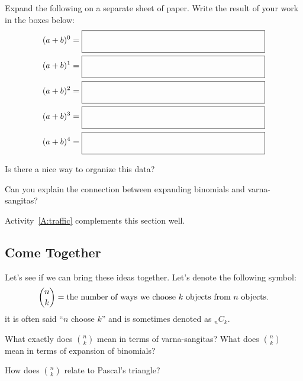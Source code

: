 Expand the following on a separate sheet of paper. Write the result
of your work in the boxes below:
\begin{align*}
(a + b)^0 &=  \raisebox{-3mm}{\fbox{\rule[0mm]{0mm}{7mm}\hspace{50ex}}} \\
(a + b)^1 &=  \raisebox{-3mm}{\fbox{\rule[0mm]{0mm}{7mm}\hspace{50ex}}} \\
(a + b)^2 &=  \raisebox{-3mm}{\fbox{\rule[0mm]{0mm}{7mm}\hspace{50ex}}} \\
(a + b)^3 &=  \raisebox{-3mm}{\fbox{\rule[0mm]{0mm}{7mm}\hspace{50ex}}} \\
(a + b)^4 &=  \raisebox{-3mm}{\fbox{\rule[0mm]{0mm}{7mm}\hspace{50ex}}} 
\end{align*}

\begin{question} Is there a nice way to organize this data?
\end{question}
\QM

\begin{question}
Can you explain the connection between expanding binomials and
varna-sangitas?
\end{question}
\QM

\begin{teachingnote}
Activity~\ref{A:traffic} complements this section well. 
\end{teachingnote}



\subsection{Come Together}

Let's see if we can bring these ideas together. Let's denote the following symbol:
\[
\binom{n}{k} = \text{the number of ways we choose $k$ objects from $n$
  objects}.\index{nchoosek@$\binom{n}{k}$}\index{nck@$_nC_k$}
\]
it is often said ``$n$ choose $k$'' and is sometimes denoted as $_n C_k$.

\begin{question}
What exactly does $\binom{n}{k}$ mean in terms of varna-sangitas? What
does $\binom{n}{k}$ mean in terms of expansion of binomials?
\end{question}
\QM

\begin{question} How does $\binom{n}{k}$ relate to Pascal's triangle?
\end{question}
\QM


